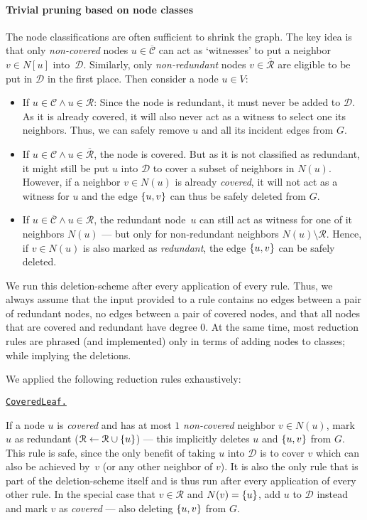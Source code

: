 \documentclass[a4paper, USenglish, cleveref, autoref, thm-restate, noalgorithm2e]{socg-lipics-v2021}
\newcommand{\set}[1]{\ensuremath\left\{#1\right\}}
\newcommand{\domset}{\ensuremath{\mathcal D}\xspace}
\newcommand{\cov}{\ensuremath{\mathcal C}\xspace}
\newcommand{\red}{\ensuremath{\mathcal R}\xspace}
\newcommand{\ccov}{\ensuremath{\overline{\mathcal C}}\xspace}
\newcommand{\cred}{\ensuremath{\overline{\mathcal R}}\xspace}
\def\defrule#1{%
    \medskip
    
    \noindent
    \underline{\texttt{#1.}}
}
\begin{document}
\paragraph*{Trivial pruning based on node classes}
The node classifications are often sufficient to shrink the graph.
The key idea is that only \emph{non-covered} nodes $u \in \ccov$ can act as `witnesses' to put a neighbor $v \in N[u]$ into~$\domset$.
Similarly, only \emph{non-redundant} nodes $v \in \cred$ are eligible to be put in $\domset$ in the first place.
Then consider a node $u \in V$:
\begin{itemize}
    \item If $u \in \cov \land u \in \red$: Since the node is redundant, it must never be added to $\domset$.
          As it is already covered, it will also never act as a witness to select one its neighbors.
          Thus, we can safely remove $u$ and all its incident edges from $G$.

    \item If $u \in \cov \land u \in \cred$, the node is covered.
          But as it is not classified as redundant, it might still be put $u$ into \domset to cover a subset of neighbors in $N(u)$.
          However, if a neighbor $v \in N(u)$ is already \emph{covered}, it will not act as a witness for $u$ and the edge $\set{u, v}$ can thus be safely deleted from $G$.

    \item If $u \in \ccov \land u \in \red$, the redundant node~$u$ can still act as witness for one of it neighbors $N(u)$ ---
          but only for non-redundant neighbors $N(u) \setminus \red$.
          Hence, if $v \in N(u)$ is also marked as \emph{redundant}, the edge $\set{u, v}$ can be safely deleted.
\end{itemize}

We run this deletion-scheme after every application of every rule.
Thus, we always assume that the input provided to a rule contains no edges between a pair of redundant nodes, no edges between a pair of covered nodes, and that all nodes that are covered and redundant have degree 0.
At the same time, most reduction rules are phrased (and implemented) only in terms of adding nodes to classes; while implying the deletions.

We applied the following reduction rules exhaustively:

\defrule{CoveredLeaf}
If a node $u$ is \emph{covered} and has at most $1$ \emph{non-covered} neighbor $v \in N(u)$, mark $u$ as redundant ($\red \gets \red \cup \set{u}$) ---
this implicitly deletes $u$ and $\set{u, v}$ from $G$. 
This rule is safe, since the only benefit of taking $u$ into \domset is to cover $v$ which can also be achieved by~$v$ (or any other neighbor of $v$).
It is also the only rule that is part of the deletion-scheme itself and is thus run after every application of every other rule.
In the special case that $v \in \red$ and $N(v) = \set{u}$, add $u$ to $\domset$ instead and mark $v$ as \emph{covered} --- also deleting $\set{u, v}$ from $G$.
\end{document}

